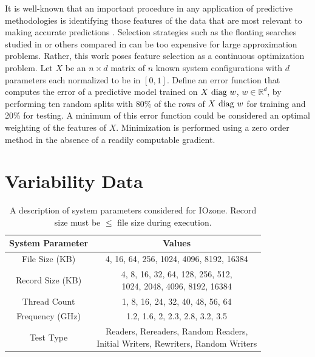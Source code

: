 It is well-known that an important procedure in any application of predictive methodologies is identifying those features of the data that are most relevant to making accurate predictions \cite{guyon2003introduction}. Selection strategies such as the floating searches studied in \cite{pudil1994floating} or others compared in \cite{ferri1994comparative} can be too expensive for large approximation problems. Rather, this work poses feature selection as a continuous optimization problem. Let $X$ be an $n \times d$ matrix of $n$ known system configurations with $d$ parameters each normalized to be in $[0,1]$. Define an error function that computes the error of a predictive model trained on $X\hbox{ diag }w$, $w \in \mathbb{R}^d$,  by performing ten random splits with 80\% of the rows of $X\hbox{ diag }w$ for training and 20\% for testing. A minimum of this error function could be considered an optimal weighting of the features of $X$. Minimization is performed using a zero order method in the absence of a readily computable gradient.


\section{Variability Data}
\label{sec:data}

\begin{table}
  \centering
  \begin{tabular}{c|c}
    \hline
    \textbf{System Parameter} & \textbf{Values}\\
    \hline
    File Size (KB) & 4, 16, 64, 256, 1024, 4096, 8192, 16384\\
    \hline
    Record Size (KB) & \multilinecell{4, 8, 16, 32, 64, 128, 256, 512,\\ 1024, 2048, 4096, 8192, 16384}\\
    \hline
    Thread Count & 1, 8, 16, 24, 32, 40, 48, 56, 64\\
    \hline
    Frequency (GHz) & 1.2, 1.6, 2, 2.3, 2.8, 3.2, 3.5\\
    \hline
    Test Type & \multilinecell{Readers, Rereaders, Random Readers, \\ Initial Writers, Rewriters, Random Writers}\\
    \hline
  \end{tabular}
  \caption{A description of system parameters considered for IOzone. Record size must be $\leq$ file size during execution.}
  \label{tab:data_description}
\end{table}

